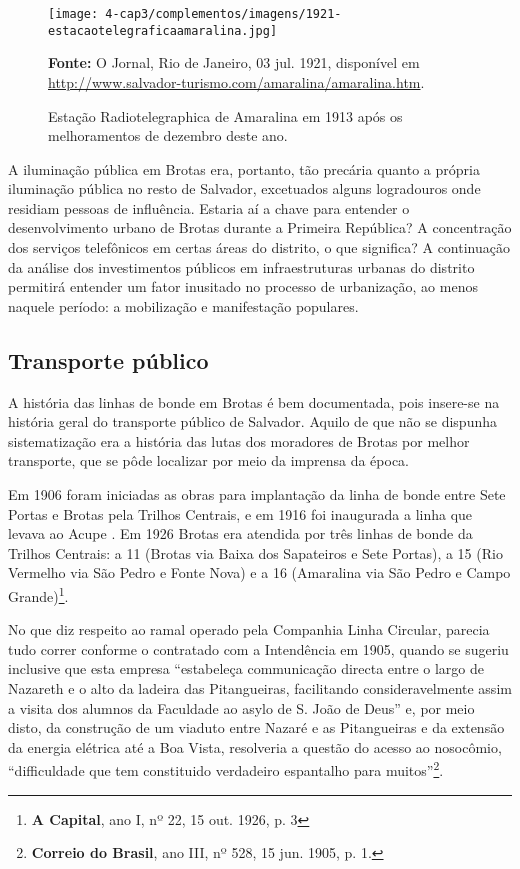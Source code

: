\begin{figure}[!htp]
\centering
\caption{Estação Radiotelegraphica de Amaralina em 1913 após os melhoramentos de dezembro deste ano.}
\texttt{[image: 4-cap3/complementos/imagens/1921-estacaotelegraficaamaralina.jpg]}{\par \footnotesize \textbf{Fonte:} O Jornal, Rio de Janeiro, 03 jul. 1921, disponível em \url{http://www.salvador-turismo.com/amaralina/amaralina.htm}.}
\label{fig:estacaotelegraphica}
\end{figure}

A iluminação pública em Brotas era, portanto, tão precária quanto a própria iluminação pública no resto de Salvador, excetuados alguns logradouros onde residiam pessoas de influência. Estaria aí a chave para entender o desenvolvimento urbano de Brotas durante a Primeira República? A concentração dos serviços telefônicos em certas áreas do distrito, o que significa? A continuação da análise dos investimentos públicos em infraestruturas urbanas do distrito permitirá entender um fator inusitado no processo de urbanização, ao menos naquele período: a mobilização e manifestação populares.

\subsection{Transporte público}

A história das linhas de bonde em Brotas é bem documentada, pois insere-se na história geral do transporte público de Salvador. Aquilo de que não se dispunha sistematização era a história das lutas dos moradores de Brotas por melhor transporte, que se pôde localizar por meio da imprensa da época.

Em 1906 foram iniciadas as obras para implantação da linha de bonde entre Sete Portas e Brotas pela Trilhos Centrais, e em 1916 foi inaugurada a linha que levava ao Acupe \cite[p.~299]{VASCONCELOS2002}. Em 1926 Brotas era atendida por três linhas de bonde da Trilhos Centrais: a 11 (Brotas via Baixa dos Sapateiros e Sete Portas), a 15 (Rio Vermelho via São Pedro e Fonte Nova) e a 16 (Amaralina via São Pedro e Campo Grande)\footnote{\textbf{A Capital}, ano I, nº 22, 15 out. 1926, p. 3}.

No que diz respeito ao ramal operado pela Companhia Linha Circular, parecia tudo correr conforme o contratado com a Intendência em 1905, quando se sugeriu inclusive que esta empresa ``estabeleça communicação directa entre o largo de Nazareth e o alto da ladeira das Pitangueiras, facilitando consideravelmente assim a visita dos alumnos da Faculdade ao asylo de S. João de Deus'' e, por meio disto, da construção de um viaduto entre Nazaré e as Pitangueiras e da extensão da energia elétrica até a Boa Vista, resolveria a questão do acesso ao nosocômio, ``difficuldade que tem constituido verdadeiro espantalho para muitos''\footnote{\textbf{Correio do Brasil}, ano III, nº 528, 15 jun. 1905, p. 1.}. 

